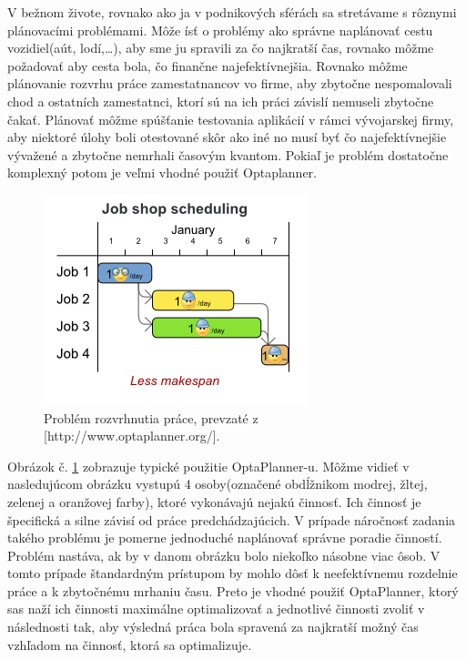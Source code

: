 V bežnom živote, rovnako ako ja v podnikových sférách sa stretávame s rôznymi plánovacími problémami. Môže ísť o problémy ako správne naplánovať cestu vozidiel(aút, lodí,\ldots), aby sme ju spravili za čo najkratší čas, rovnako môžme požadovať aby cesta bola, čo finančne najefektívnejšia. Rovnako môžme plánovanie rozvrhu práce zamestatnancov vo firme, aby zbytočne nespomalovali chod a ostatních zamestatnci, ktorí sú na ich práci závislí nemuseli zbytočne čakať. Plánovať môžme spúšťanie testovania aplikácií v rámci vývojarskej firmy, aby niektoré úlohy boli otestované skôr ako iné no musí byť čo najefektívnejšie vývažené a zbytočne nemrhali časovým kvantom. Pokiaľ je problém dostatočne komplexný potom je veľmi vhodné použiť Optaplanner. 
\newpage
\begin{figure}[htb]

\begin{center}

\includegraphics[scale=0.7]{fig/useCaseOverview.jpg} 
\caption{Problém rozvrhnutia práce, prevzaté z [http://www.optaplanner.org/]. }
\label{obrazokUseCase}

\end{center}

\end{figure}
Obrázok č. \ref{obrazokUseCase} zobrazuje typické použitie OptaPlanner-u. Môžme vidieť v nasledujúcom obrázku vystupú 4 osoby(označené obdĺžnikom modrej, žltej, zelenej a oranžovej farby), ktoré vykonávajú nejakú činnosť. Ich činnosť je špecifická a silne závisí od práce predchádzajúcich. V prípade náročnosť zadania takého problému je pomerne jednoduché naplánovať správne poradie činností. Problém nastáva, ak by v danom obrázku bolo niekoľko násobne viac ôsob. V tomto prípade štandardným prístupom by mohlo dôsť k neefektívnemu rozdelnie práce a k zbytočnému mrhaniu času. Preto je vhodné použiť OptaPlanner, ktorý sas naží ich činnosti maximálne optimalizovať a jednotlivé činnosti zvoliť v následnosti tak, aby výsledná práca bola spravená za najkratší možný čas vzhľadom na činnosť, ktorá sa optimalizuje.

